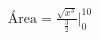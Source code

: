 \documentclass[preview]{standalone}
\begin{document}
\begin{align*}
\text{Área} = \frac{\sqrt{x^{3}}}{\frac{3}{2}}\bigg|_{0}^{10}
\end{align*}
\end{document}

